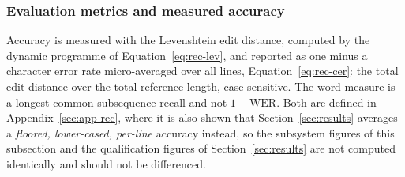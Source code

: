 \subsubsection{Evaluation metrics and measured accuracy}

Accuracy is measured with the Levenshtein edit distance, computed by the dynamic programme of Equation~\ref{eq:rec-lev}, and reported as one minus a character error rate micro-averaged over all lines, Equation~\ref{eq:rec-cer}: the total edit distance over the total reference length, case-sensitive.
The word measure is a longest-common-subsequence recall and not $1-\mathrm{WER}$.
Both are defined in Appendix~\ref{sec:app-rec}, where it is also shown that Section~\ref{sec:results} averages a \emph{floored, lower-cased, per-line} accuracy instead, so the subsystem figures of this subsection and the qualification figures of Section~\ref{sec:results} are not computed identically and should not be differenced.

